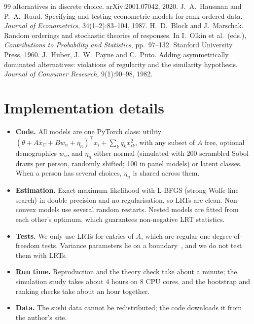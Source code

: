 \documentclass[11pt,a4paper]{article}
\theoremstyle{remark}
\newcommand{\xb}{\bar{x}}
\begin{document}
\begin{thebibliography}{99}
  alternatives in discrete choice. arXiv:2001.07042, 2020.
 J.~A.~Hausman and P.~A.~Ruud. Specifying and testing econometric models for rank-ordered
  data. \emph{Journal of Econometrics}, 34(1--2):83--104, 1987.
 H.~D.~Block and J.~Marschak. Random orderings and stochastic theories of responses. In
  I.~Olkin et al.\ (eds.), \emph{Contributions to Probability and Statistics}, pp.~97--132. Stanford
  University Press, 1960.
 J.~Huber, J.~W.~Payne and C.~Puto. Adding asymmetrically dominated alternatives: violations
  of regularity and the similarity hypothesis. \emph{Journal of Consumer Research}, 9(1):90--98, 1982.
\end{thebibliography}

\appendix
\section{Implementation details}
\label{app:impl}

\begin{itemize}
\item \textbf{Code.} All models are one PyTorch class: utility $(\theta+A\xb_C+Bw_n+\eta_n)^\top x_i +
      \sum_kq_kx_{ik}^2$, with any subset of $A$ free, optional demographics $w_n$, and $\eta_n$ either normal
      (simulated with 200 scrambled Sobol draws per person, randomly shifted; 100 in panel models) or latent
      classes. When a person has several choices, $\eta_n$ is shared across them.
\item \textbf{Estimation.} Exact maximum likelihood with L-BFGS (strong Wolfe line search) in double
      precision and no regularisation, so LRTs are clean. Non-convex models use several random restarts.
      Nested models are fitted from each other's optimum, which guarantees non-negative LRT statistics.
\item \textbf{Tests.} We only use LRTs for entries of $A$, which are regular one-degree-of-freedom tests.
      Variance parameters lie on a boundary~\cite{train09}, and we do not test them with LRTs.
\item \textbf{Run time.} Reproduction and the theory check take about a minute; the simulation study takes
      about 4 hours on 8 CPU cores, and the bootstrap and ranking checks take about an hour together.
\item \textbf{Data.} The sushi data cannot be redistributed; the code downloads it from the author's site.
\end{itemize}
\end{document}
